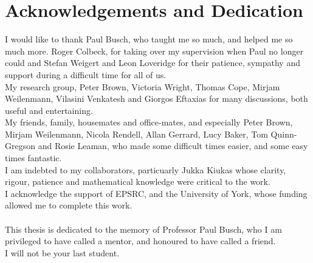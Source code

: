
\chapter*{Acknowledgements and Dedication}
\setcounter{page}{11}
\begin{SingleSpace}

I would like to thank Paul Busch, who taught me so much, and helped me so much more. Roger Colbeck, for taking over my supervision when Paul no longer could and Stefan Weigert and Leon Loveridge for their patience, sympathy and support during a difficult time for all of us.\\
My research group, Peter Brown, Victoria Wright, Thomas Cope, Mirjam Weilenmann, Vilasini Venkatesh and Giorgos Eftaxias for many discussions, both useful and entertaining.\\
My friends, family, housemates and office-mates, and especially Peter Brown, Mirjam Weilenmann, Nicola Rendell, Allan Gerrard, Lucy Baker, Tom Quinn-Gregson and Rosie Leaman, who made some difficult times easier, and some easy times fantastic.\\
I am indebted to my collaborators, particuarly Jukka Kiukas whose clarity, rigour, patience and mathematical knowledge were critical to the work.\\
I acknowledge the support of EPSRC, and the University of York, whose funding allowed me to complete this work.\\ \\
This thesis is dedicated to the memory of Professor Paul Busch, who I am privileged to have called a mentor, and honoured to have called a friend. \\I will not be your last student.
\end{SingleSpace}



\clearpage